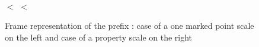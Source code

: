 \begin{figure}[H]\small
\begin{minipage}{0.5\textwidth}
\\
\centering
{} $<$  $<$ 
 \end{minipage}\hfill%
 \begin{minipage}{0.45\textwidth}
 \end{minipage}
\caption{Frame representation of the prefix : case of a one marked point scale on the left and case of a property scale on the right \label{app:pere:iter}}
\end{figure}

